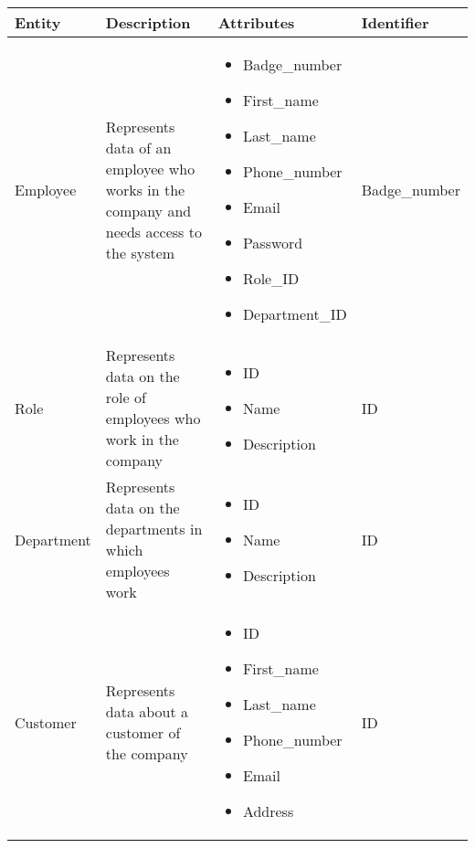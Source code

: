\begin{longtable}{|p{}|p{} |p{}|p{} |}
    \hline
    \textbf{Entity} & \textbf{Description} & \textbf{Attributes} & \textbf{Identifier}  \\\hline

    Employee & Represents data of an employee who works in the company and needs access to the system &
    \begin{itemize}
        \vspace{-1em}
        \item Badge\_number
        \item First\_name
        \item Last\_name
        \item Phone\_number
        \item Email
        \item Password
        \item Role\_ID
        \item Department\_ID
    \end{itemize}
    &  Badge\_number\\\hline

    Role & Represents data on the role of employees who work in the company &
    \begin{itemize}
        \vspace{-1em}
        \item ID
        \item Name
        \item Description
    \end{itemize}
    &  ID\\\hline

    Department & Represents data on the departments in which employees work &
    \begin{itemize}
        \vspace{-1em}
        \item ID
        \item Name
        \item Description
    \end{itemize}
    &  ID\\\hline

    Customer & Represents data about a customer of the company &
    \begin{itemize}
        \vspace{-1em}
        \item ID
        \item First\_name
        \item Last\_name
        \item Phone\_number
        \item Email
        \item Address
    \end{itemize}
    &  ID\\\hline


\end{longtable}
